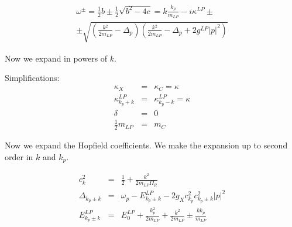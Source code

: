 \documentclass[a4paper,prb,10pt,aps,twocolumn]{revtex4-1}
\begin{document}
\begin{multline}
  \label{eq:84}
\omega^{\pm}=\frac{1}{2}b\pm\frac{1}{2}\sqrt{b^{2}-4c}=k\frac{k_{p}}{m_{LP}}-i\kappa^{LP}\pm\\
\pm\sqrt{(\frac{k{}^{2}}{2m_{LP}}-\Delta_{p})(\frac{k{}^{2}}{2m_{LP}}-\Delta_{p}+2g^{LP}|p|^{2})}  
\end{multline}

Now we expand in powers of $k$.

Simplifications:
\begin{subequations}
  \begin{eqnarray}
    \label{eq:85}
\kappa_{X}&=&\kappa_{C}=\kappa\\
\kappa_{k_{p}+k}^{LP}&=&\kappa_{k_{p}-k}^{LP}=\kappa\\
\delta&=&0 \\ 
\frac{1}{2}m_{LP}&=&m_{C}    
  \end{eqnarray}
\end{subequations}





Now we expand the Hopfield coefficients. We make the expansion up
to second order in $k$ and $k_{p}$.

\begin{subequations}
  \begin{eqnarray}
    \label{eq:88}
c_{k}^{2}&=&\frac{1}{2}+\frac{k^{2}}{2m_{LP}\Omega_{R}}\\
\Delta_{k_{p}\pm k}&=&\omega_{p}-E_{k_{p}\pm k}^{LP}-2g_{X}c_{k_{p}}^{2}c_{k_{p}\pm k}^{2}|p|^{2}\\
E_{k_{p}\pm k}^{LP}&=&E_{0}^{LP}+\frac{k_{p}^{2}}{2m_{LP}}+\frac{k^{2}}{2m_{LP}}\pm \frac{kk_{p}}{m_{LP}}
  \end{eqnarray}
\end{subequations}
\end{document}
